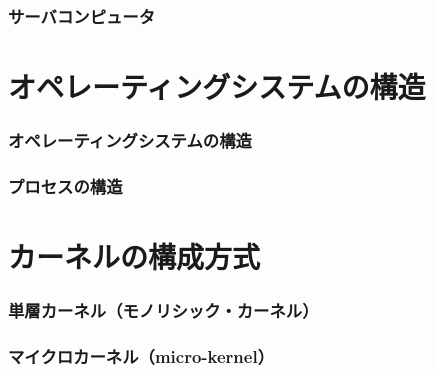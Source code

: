 \documentclass[dvipdfmx]{beamer}
\begin{document}
\begin{frame}
  \frametitle{サーバコンピュータ}
\end{frame}

\section{オペレーティングシステムの構造}
\begin{frame}
  \frametitle{オペレーティングシステムの構造}
\end{frame}

\begin{frame}
  \frametitle{プロセスの構造}
\end{frame}

\section{カーネルの構成方式}
\begin{frame}
  \frametitle{単層カーネル（モノリシック・カーネル）}
\end{frame}

\begin{frame}
  \frametitle{マイクロカーネル（micro-kernel）}
\end{frame}
\end{document}
